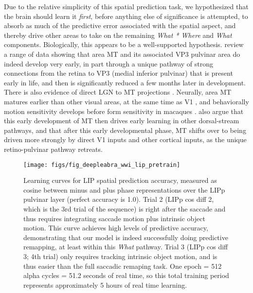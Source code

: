 \documentclass[11pt,twoside]{article}
\newif\myifpdf
\begin{document}
Due to the relative simplicity of this spatial prediction task, we hypothesized that the brain should learn it {\em first}, before anything else of significance is attempted, to absorb as much of the predictive error associated with the spatial aspect, and thereby drive other areas to take on the remaining {\em What * Where} and {\em What} components.  Biologically, this appears to be a well-supported hypothesis.   review a range of data showing that area MT and its associated VP3 pulvinar area do indeed develop very early, in part through a unique pathway of strong connections from the retina to VP3 (medial inferior pulvinar) that is present early in life, and then is significantly reduced a few months later in development. There is also evidence of direct LGN to MT projections \cite{SincichParkWohlgemuthEtAl04}.  Neurally, area MT matures earlier than other visual areas, at the same time as V1 \cite{BourneRosa06}, and behaviorally motion sensitivity develops before form sensitivity in macaques \cite{KiorpesPriceHall-HaroEtAl12}.   also argue that this early development of MT then drives early learning in other dorsal-stream pathways, and that after this early developmental phase, MT shifts over to being driven more strongly by direct V1 inputs and other cortical inputs, as the unique retino-pulvinar pathway retreats.

\begin{figure}
  \centering\texttt{[image: figs/fig\_deepleabra\_wwi\_lip\_pretrain]}
  \caption{\footnotesize Learning curves for LIP spatial prediction accuracy, measured as cosine between minus and plus phase representations over the LIPp pulvinar layer (perfect accuracy is 1.0).  Trial 2 (LIPp cos diff 2, which is the 3rd trial of the sequence) is right after the saccade and thus requires integrating saccade motion plus intrinsic object motion.  This curve achieves high levels of predictive accuracy, demonstrating that our model is indeed successfully doing predictive remapping, at least within this {\em What} pathway.  Trial 3 (LIPp cos diff 3; 4th trial) only requires tracking intrinsic object motion, and is thus easier than the full saccadic remaping task.  One epoch = 512 alpha cycles = 51.2 seconds of real time, so this total training period represents approximately 5 hours of real time learning. }
  \label{fig.lip_pretrain}
\end{figure}
\end{document}
